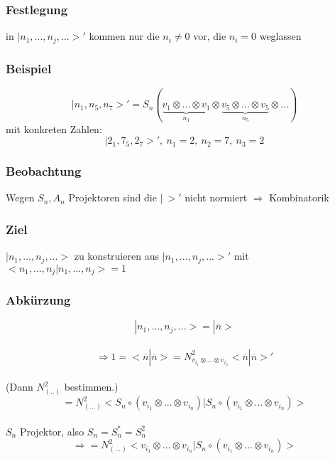 \documentclass[twoside,a4paper]{scrartcl}
\renewcommand{\1}{\mathds{1}}
\newcommand{\Ra}{\Rightarrow}
\begin{document}
\subsubsection*{Festlegung} 
in $|n_1,...,n_j,...>'$ kommen nur die $n_i\neq 0$ vor, die $n_i=0$ weglassen
\subsubsection*{Beispiel} 
$$|n_1,n_5,n_7>'=S_n (\underbrace {v_1\otimes ... \otimes v_1}_{n_1} \otimes \underbrace {v_5 \otimes ... \otimes v_5}_{n_5} \otimes ...)$$
mit konkreten Zahlen:
$$|2_1,7_5,2_7>', \ n_1=2, \ n_2=7, \ n_3=2$$
\subsubsection*{Beobachtung} 
Wegen $S_n,A_n$ Projektoren sind die $| \ >'$ nicht normiert $\Ra$ Kombinatorik
\subsubsection*{Ziel} 
$|n_1,...,n_j,...>$ zu konstruieren aus $|n_1,...,n_j,...>'$ mit $<n_1,...,n_j|n_1,...,n_j>=1$
\subsubsection*{Abkürzung} 
$$|n_1,...,n_j,...>=|\overline{n}>$$\\$$ \Ra 1=<\overline{n}|\overline{n}>=N^2_{v_{i_1}\otimes ... \otimes v_{i_n}}<\overline{n}|\overline{n}>'$$\\
(Dann $N^2_{(..)}$ bestimmen.)\\
$$=N^2_{(...)}<S_n \circ (v_{i_1}\otimes ... \otimes v_{i_n})|S_n \circ (v_{i_1}\otimes ... \otimes v_{i_n})>$$\\
$S_n$ Projektor, also $S_n=S_n^*=S_n^2$\\
$$\Ra = N^2_{(...)}<v_{i_1}\otimes ... \otimes v_{i_n}|S_n \circ (v_{i_1}\otimes ... \otimes v_{i_n})>$$
\end{document}
